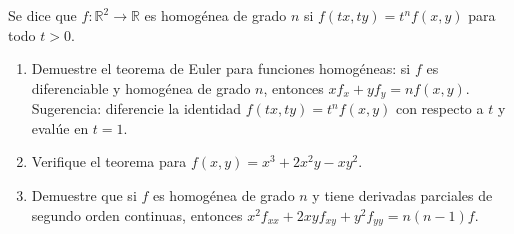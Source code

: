 Se dice que $f: \mathbb{R}^2 \to \mathbb{R}$ es homogénea de grado $n$ si $f(tx, ty) = t^n f(x, y)$ para todo $t > 0$.
\begin{enumerate}
    \item Demuestre el teorema de Euler para funciones homogéneas: si $f$ es diferenciable y homogénea de grado $n$, entonces $x f_x + y f_y = n f(x, y)$. Sugerencia: diferencie la identidad $f(tx, ty) = t^n f(x,y)$ con respecto a $t$ y evalúe en $t = 1$.
    \item Verifique el teorema para $f(x, y) = x^3 + 2x^2y - xy^2$.
    \item Demuestre que si $f$ es homogénea de grado $n$ y tiene derivadas parciales de segundo orden continuas, entonces $x^2 f_{xx} + 2xy f_{xy} + y^2 f_{yy} = n(n-1)f$.
\end{enumerate}
